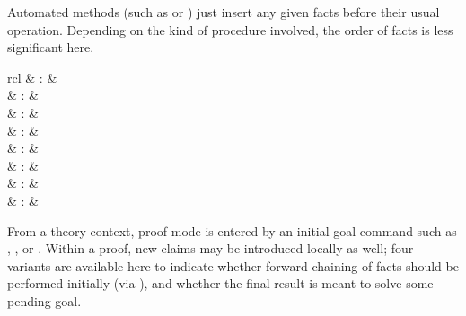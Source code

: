 \begin{isabellebody}
\begin{isamarkuptext}
  Automated methods (such as \hyperlink{method.simp}{\mbox{}} or \hyperlink{method.auto}{\mbox{}}) just
  insert any given facts before their usual operation.  Depending on
  the kind of procedure involved, the order of facts is less
  significant here.%
\end{isamarkuptext}%
\isamarkuptrue%
%
\isamarkuptrue%
%
\begin{isamarkuptext}%
\begin{matharray}{rcl}
    \hypertarget{command.lemma}{\hyperlink{command.lemma}{\mbox{}}} & : &  \\
    \hypertarget{command.theorem}{\hyperlink{command.theorem}{\mbox{}}} & : &  \\
    \hypertarget{command.corollary}{\hyperlink{command.corollary}{\mbox{}}} & : &  \\
    \hypertarget{command.have}{\hyperlink{command.have}{\mbox{}}} & : &  \\
    \hypertarget{command.show}{\hyperlink{command.show}{\mbox{}}} & : &  \\
    \hypertarget{command.hence}{\hyperlink{command.hence}{\mbox{}}} & : &  \\
    \hypertarget{command.thus}{\hyperlink{command.thus}{\mbox{}}} & : &  \\
    \hypertarget{command.print-statement}{\hyperlink{command.print-statement}{\mbox{}}}\isa{{\isachardoublequote}\isactrlsup {\isacharasterisk}{\isachardoublequote}} & : &  \\
  \end{matharray}

  From a theory context, proof mode is entered by an initial goal
  command such as \hyperlink{command.lemma}{\mbox{}}, \hyperlink{command.theorem}{\mbox{}}, or
  \hyperlink{command.corollary}{\mbox{}}.  Within a proof, new claims may be
  introduced locally as well; four variants are available here to
  indicate whether forward chaining of facts should be performed
  initially (via \hyperlink{command.then}{\mbox{}}), and whether the final result
  is meant to solve some pending goal.


\end{isamarkuptext}
\end{isabellebody}

